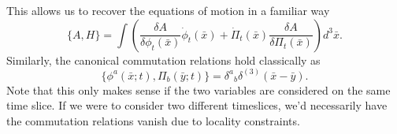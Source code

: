 This allows us to recover the equations of motion in a familiar
way
\begin{equation}%
\{A,H\} = \int\left(\frac{\delta A}{\delta\phi_{t}(\bar{x})}\dot{\phi}_{t}(\bar{x})+\dot{\Pi}_{t}(\bar{x})\frac{\delta A}{\delta\Pi_{t}(\bar{x})}\right)d^{3}\bar{x}.
\end{equation}
Similarly, the canonical commutation relations hold classically
as
\begin{equation}%
\{\phi^{a}(\bar{x};t),\Pi_{b}(\bar{y};t)\} = {\delta^{a}}_{b}\delta^{(3)}(\bar{x}-\bar{y}).
\end{equation}
Note that this only makes sense if the two variables are
considered on the same time slice. If we were to consider two
different timeslices, we'd necessarily have the commutation
relations vanish due to locality constraints.
